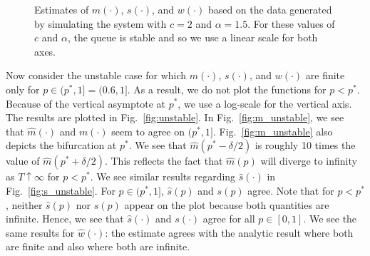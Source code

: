 \documentclass[conference]{IEEEtran}
\begin{document}
\begin{figure}



  \caption{Estimates of $m(\cdot)$, $s(\cdot)$, and $w(\cdot)$ based
    on the data generated by simulating the system with $c = 2$ and
    $\alpha = 1.5$. For these values of $c$ and $\alpha$, the queue is
    stable and so we use a linear scale for both
    axes.\label{fig:stable}}
\end{figure}




Now consider the unstable case for which $m(\cdot)$, $s(\cdot)$, and
$w(\cdot)$ are finite only for $p \in (p^*, 1] = (0.6, 1]$. As a
result, we do not plot the functions for $p < p^*$. Because of the
vertical asymptote at $p^*$, we use a log-scale for the vertical
axis. The results are plotted in Fig.~\ref{fig:unstable}. In
Fig.~\ref{fig:m_unstable}, we see that $\hat m(\cdot)$ and $m(\cdot)$
seem to agree on $(p^*, 1]$. Fig.~\ref{fig:m_unstable} also depicts
the bifurcation at $p^*$.  We see that $\hat m(p^* - \delta/2)$ is
roughly 10 times the value of $\hat m(p^* + \delta/2)$. This reflects
the fact that $\hat m(p)$ will diverge to infinity as $T \uparrow
\infty$ for $p < p^*$. We see similar results regarding $\hat
s(\cdot)$ in Fig.~\ref{fig:s_unstable}. For $p \in (p^*, 1]$, $\hat
s(p)$ and $s(p)$ agree. Note that for $p < p^*$, neither $\hat s(p)$
nor $s(p)$ appear on the plot because both quantities are
infinite. Hence, we see that $\hat s(\cdot)$ and $s(\cdot)$ agree for
all $p \in [0, 1]$. We see the same results for $\hat w(\cdot)$: the
estimate agrees with the analytic result where both are finite and
also where both are infinite.
\end{document}
